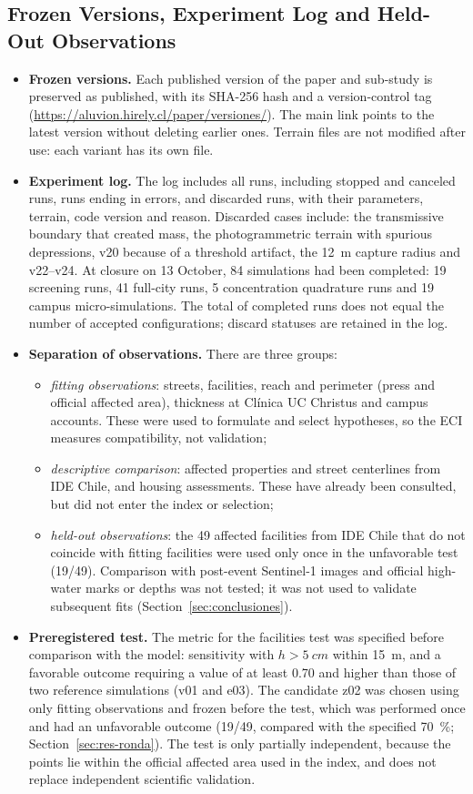 \subsection*{Frozen Versions, Experiment Log and Held-Out Observations}
\begin{itemize}
\item \textbf{Frozen versions.} Each published version of the paper and sub-study is preserved as published, with its SHA-256 hash and a version-control tag (\url{https://aluvion.hirely.cl/paper/versiones/}). The main link points to the latest version without deleting earlier ones. Terrain files are not modified after use: each variant has its own file.
\item \textbf{Experiment log.} The log includes all runs, including stopped and canceled runs, runs ending in errors, and discarded runs, with their parameters, terrain, code version and reason. Discarded cases include: the transmissive boundary that created mass, the photogrammetric terrain with spurious depressions, v20 because of a threshold artifact, the \SI{12}{m} capture radius and v22--v24. At closure on 13 October, 84 simulations had been completed: 19 screening runs, 41 full-city runs, 5 concentration quadrature runs and 19 campus micro-simulations. The total of completed runs does not equal the number of accepted configurations; discard statuses are retained in the log.
\item \textbf{Separation of observations.} There are three groups:
  \begin{itemize}
  \item \emph{fitting observations}: streets, facilities, reach and perimeter (press and official affected area), thickness at Clínica UC Christus and campus accounts. These were used to formulate and select hypotheses, so the ECI measures compatibility, not validation;
  \item \emph{descriptive comparison}: affected properties and street centerlines from IDE Chile, and housing assessments. These have already been consulted, but did not enter the index or selection;
  \item \emph{held-out observations}: the 49 affected facilities from IDE Chile that do not coincide with fitting facilities were used only once in the unfavorable test (19/49). Comparison with post-event Sentinel-1 images and official high-water marks or depths was not tested; it was not used to validate subsequent fits (Section~\ref{sec:conclusiones}).
  \end{itemize}
\item \textbf{Preregistered test.} The metric for the facilities test was specified before comparison with the model: sensitivity with $h>\SI{5}{cm}$ within \SI{15}{m}, and a favorable outcome requiring a value of at least 0.70 and higher than those of two reference simulations (v01 and e03). The candidate z02 was chosen using only fitting observations and frozen before the test, which was performed once and had an unfavorable outcome (19/49, compared with the specified \SI{70}{\percent}; Section~\ref{sec:res-ronda}). The test is only partially independent, because the points lie within the official affected area used in the index, and does not replace independent scientific validation.
\end{itemize}
